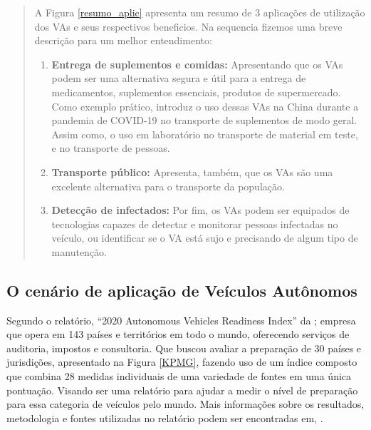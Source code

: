 \begin{quote}

A Figura \ref{resumo_aplic} apresenta um resumo de 3 aplicações de utilização dos VAs e seus respectivos beneficios. Na sequencia fizemos uma breve descrição para um melhor entendimento:

\begin{enumerate}
 \item \textbf{Entrega de suplementos e comidas:} Apresentando que os VAs podem ser uma alternativa segura e útil para a entrega de medicamentos, suplementos essenciais, produtos de supermercado. Como exemplo prático, introduz o uso dessas VAs na China durante a pandemia de COVID-19 no transporte de suplementos de modo geral. Assim como, o uso em laboratório no transporte de material em teste, e no transporte de pessoas.

\item \textbf{Transporte público:} Apresenta, também, que os VAs são uma excelente alternativa para o transporte da população. 

\item \textbf{Detecção de infectados:} Por fim, os VAs podem ser equipados de tecnologias capazes de detectar e monitorar pessoas infectadas no veículo, ou identificar se o VA está sujo e precisando de algum tipo de manutenção. 

\end{enumerate}

\end{quote}

\subsection{O cenário de aplicação de Veículos Autônomos}
Segundo o relatório, “2020 Autonomous Vehicles Readiness Index” da \cite{KPMG}; empresa que opera em 143 países e territórios em todo o mundo, oferecendo serviços de auditoria, impostos e consultoria.
Que buscou avaliar a preparação de 30 países e jurisdições, apresentado na Figura \ref{KPMG}, fazendo uso de um índice composto que combina 28 medidas individuais de uma variedade de fontes em uma única pontuação. Visando ser uma relatório para ajudar a medir o nível de preparação para essa categoria de veículos pelo mundo. Mais informações sobre os resultados, metodologia e fontes utilizadas no relatório podem ser encontradas em, \cite{KPMG}.

